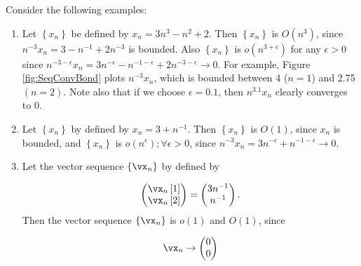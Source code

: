 \documentclass[english,12pt]{book}\usepackage[]{graphicx}\usepackage[]{xcolor}
\begin{document}
\begin{example}
Consider the following examples:

\begin{enumerate}
  \item Let $\left\lbrace x_n\right\rbrace$ be defined by $x_n = 3n^3 - n^2 + 2$. Then $\left\lbrace x_n\right\rbrace$ is $O(n^3)$, since $n^{-3}x_n = 3 - n^{-1} + 2n^{-3}$ is bounded. Also $\left\lbrace x_n\right\rbrace$ is $o(n^{3 + \epsilon})$ for any $\epsilon > 0$ since $n^{ - 3 - \epsilon}x_n = 3n^{-\epsilon} - n^{-1 - \epsilon} + 2n^{-3 - \epsilon}\to 0$. For example, Figure \ref{fig:SeqConvBond} plots $n^{-3}x_n$, which is bounded between 4 ($n = 1$) and 2.75 $(n = 2)$. Note also that if we choose $\epsilon = 0.1$, then $n^{3.1}x_n$ clearly converges to 0.
  \item Let $\left\lbrace x_n\right\rbrace$ by defined by $x_n = 3 + n^{-1}$. Then $\left\lbrace x_n\right\rbrace$ is $O(1)$, since $x_n$ is bounded, and $\left\lbrace x_n\right\rbrace$ is $o(n^\epsilon);\forall \epsilon > 0$, since $n^{-3}x_n = 3n^{-\epsilon} + n^{-1 - \epsilon}\to 0$. 
  \item Let the vector sequence $\left\lbrace \vx_n\right\rbrace$ by defined by
  
  \begin{equation*}
    \begin{pmatrix}
    \vx_n\left[1\right] \\
    \vx_n\left[2\right]
    \end{pmatrix}= 
    \begin{pmatrix}
      3n^{-1} \\
      n^{-1}
    \end{pmatrix}.
  \end{equation*}
  Then the vector sequence $\left\lbrace \vx_n\right\rbrace$ is $o(1)$ and $O(1)$, since
  
  \begin{equation*}
    \vx_n \to \begin{pmatrix} 0 \\ 0 \end{pmatrix}
  \end{equation*}
\end{enumerate}
\end{example}
\end{document}
